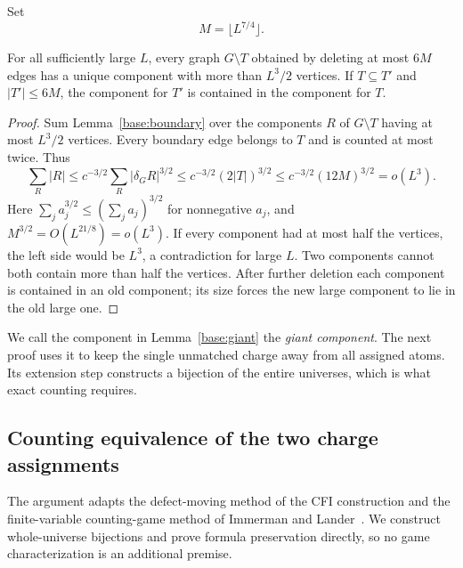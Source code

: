Set
\begin{equation}
\label{base:M}
 M=\lfloor L^{7/4}\rfloor.
\end{equation}

\begin{lemma}
\label{base:giant}
For all sufficiently large $L$, every graph $G\setminus T$ obtained by
deleting at most $6M$ edges has a unique component with more than
$L^3/2$ vertices.  If $T\subseteq T'$ and $|T'|\le6M$, the component
for $T'$ is contained in the component for $T$.
\end{lemma}
\begin{proof}
Sum Lemma~\ref{base:boundary} over the components $R$ of $G\setminus T$
having at most $L^3/2$ vertices.  Every boundary edge belongs to $T$
and is counted at most twice.  Thus
\begin{equation}
\label{base:small-components}
 \sum_R |R|
 \le c^{-3/2}\sum_R|\delta_G R|^{3/2}
 \le c^{-3/2}(2|T|)^{3/2}
 \le c^{-3/2}(12M)^{3/2}=o(L^3).
\end{equation}
Here $\sum_j a_j^{3/2}\le(\sum_j a_j)^{3/2}$ for nonnegative $a_j$,
and $M^{3/2}=O(L^{21/8})=o(L^3)$.  If every component had at most half
the vertices, the left side would be $L^3$, a contradiction for large
$L$.  Two components cannot both contain more than half the vertices.
After further deletion each component is contained in an old component;
its size forces the new large component to lie in the old large one.
\end{proof}

We call the component in Lemma~\ref{base:giant} the \emph{giant
component}.  The next proof uses it to keep the single unmatched charge
away from all assigned atoms.  Its extension step constructs a bijection
of the entire universes, which is what exact counting requires.

\subsection{Counting equivalence of the two charge assignments}

The argument adapts the defect-moving method of the CFI construction
\cite[Section~6]{cfi1992} and the finite-variable counting-game method
of Immerman and Lander~\cite[Counting Quantifiers]{immermanLander1990}.
We construct whole-universe bijections and prove formula preservation
directly, so no game characterization is an additional premise.

